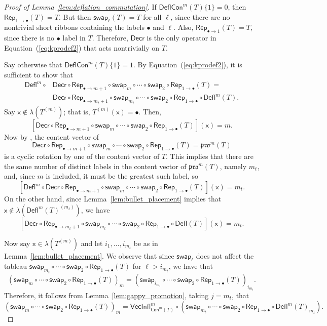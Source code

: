 \documentclass[12pt]{amsart}
\newcommand{\x}{\ensuremath{\mathsf{x}}}
\theoremstyle{definition}
\theoremstyle{remark}
\numberwithin{equation}{section}
\newcommand{\pro}{\mathfrak{pro}}
\newcommand{\swap}{\ensuremath{\mathsf{swap}}}
\newcommand{\decr}{\ensuremath{\mathsf{Decr}}}
\newcommand{\rep}{\ensuremath{\mathsf{Rep}}}
\newcommand{\deflate}{\ensuremath{\mathsf{Defl}}}
\newcommand{\inflate}{\ensuremath{\mathsf{VecInfl}}}
\newcommand{\content}{\ensuremath{\mathsf{Con}}}
\newcommand{\compress}{\ensuremath{\mathsf{DeflCon}}}
\begin{document}
\begin{proof}[Proof of Lemma~\ref{lem:deflation_commutation}]
If $\compress^m(T)\lbrace 1 \rbrace = 0$, then $\rep_{1 \rightarrow \bullet}(T) = T$. But then $\swap_\ell(T) = T$ for all $\ell$, since there are no nontrivial short ribbons containing the labels $\bullet$ and $\ell$. Also, $\rep_{\bullet \rightarrow 1}(T) = T$, since there is no $\bullet$ label in $T$. Therefore, $\decr$ is the only operator in Equation~(\ref{eq:kprodef2}) that acts nontrivially on $T$. 


Say otherwise that $\compress^m(T)\lbrace 1 \rbrace = 1$. By Equation~(\ref{eq:kprodef2}), it is sufficient to show that
\begin{align*}
\deflate^m \circ &\decr \circ \rep_{\bullet \rightarrow m+1} \circ \swap_m \circ \cdots \circ \swap_2\circ \rep_{1 \rightarrow \bullet} (T) = \\
 & \decr \circ \rep_{\bullet \rightarrow m_t+1} \circ \swap_{m_t} \circ \cdots \circ \swap_2 \circ \rep_{1 \rightarrow \bullet} \circ \deflate^m (T). 
\end{align*}
Say $\x \not \in \lambda(T^{(m)})$; that is,  $T^{(m)}(\x) = \bullet$.  Then,
\[
[\decr \circ \rep_{\bullet \rightarrow m+1} \circ \swap_m \circ \cdots \circ \swap_2 \circ \rep_{1 \rightarrow \bullet} (T)](\x) = m.
\]
Now by \cite[Lemma~2.1]{DPS}, the content vector of  
\[
\decr \circ \rep_{\bullet \rightarrow m+1} \circ \swap_m \circ \cdots \circ \swap_2 \circ \rep_{1 \rightarrow \bullet} (T) = \pro^m(T)
\]
 is a cyclic rotation by one of the content vector of $T$. This implies that there are the same number of distinct labels in the content vector of $\pro^m(T)$, namely $m_t$, and, since $m$ is included, it must be the greatest such label, so 
 \[
 [\deflate^m \circ \decr \circ \rep_{\bullet \rightarrow m+1} \circ \swap_m \circ \cdots \circ \swap_2 \circ \rep_{1 \rightarrow \bullet} (T)](\x) = m_t.
 \]
  On the other hand, since Lemma~\ref{lem:bullet_placement} implies that $\x \not \in \lambda(\deflate^m(T)^{(m_t)})$, we have
  \[
  [\decr \circ \rep_{\bullet \rightarrow m_t + 1} \circ \swap_{m_t} \circ \cdots \circ \swap_2 \circ \rep_{1 \rightarrow \bullet} \circ \deflate(T)](\x) = m_t.
  \] 

Now say $\x \in \lambda(T^{(m)})$ and let $i_1, \ldots, i_{m_t}$ be as in Lemma~\ref{lem:bullet_placement}. We observe that since $\swap_\ell$ does not affect the tableau $\swap_{m_t} \circ \cdots \circ \swap_2 \circ \rep_{1 \rightarrow \bullet} (T)$ for $\ell > i_{m_t}$, we have that
\[ (\swap_m \circ \cdots \circ \swap_2 \circ \rep_{1 \rightarrow \bullet}( T ))_m = (\swap_{i_{m_t}} \circ \cdots \circ \swap_2 \circ \rep_{1 \rightarrow \bullet}( T ))_{i_{m_t}}.  \]
Therefore, it follows from Lemma~\ref{lem:gappy_promotion}, taking $j = m_t$, that 
\[ (\swap_m \circ \cdots \circ \swap_2 \circ \rep_{1 \rightarrow \bullet}( T ))_m = \inflate^m_{\content^m(T)} \circ (\swap_{m_t} \circ \cdots \circ   \swap_2  \circ \rep_{1 \rightarrow \bullet} \circ \deflate^m(T)_{m_t}). \]


\end{proof}
\end{document}
